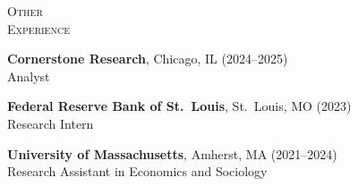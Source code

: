\documentclass[11pt]{article}
\newcommand{\cvsection}[1]{%
  \vspace{8pt}\par
  \noindent
  \begin{minipage}[t]{1.25in}%
    {\small\textsc{#1}}%
  \end{minipage}\hspace{0.15in}%
  \begin{minipage}[t]{5.4in}%
}
\newcommand{\cvend}{%
  \end{minipage}\par%
}
\begin{document}
\cvsection{Other\\Experience}
\textbf{Cornerstone Research}, Chicago, IL (2024--2025)\\
\hspace*{12pt}Analyst

\vspace{4pt}
\textbf{Federal Reserve Bank of St.\ Louis}, St.\ Louis, MO (2023)\\
\hspace*{12pt}Research Intern

\vspace{4pt}
\textbf{University of Massachusetts}, Amherst, MA (2021--2024)\\
\hspace*{12pt}Research Assistant in Economics and Sociology
\cvend
\end{document}
